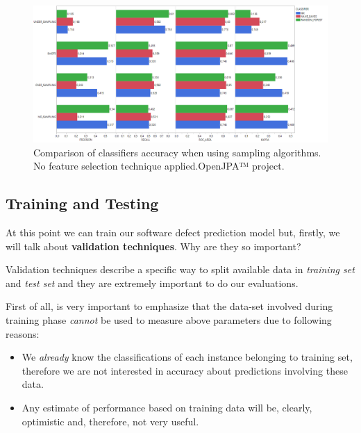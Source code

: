 \documentclass[sigconf]{acmart}
\begin{document}
\begin{figure}[h!]
  \centering
  \includegraphics[width=\textwidth]{./OPENJPA/Sampling.png}
  \caption{Comparison of classifiers accuracy when using sampling algorithms. No feature selection technique applied.\newline OpenJPA™ project. \newline\newline\newline\newline\newline}
  \label{OPENJPA-Sampling}
\end{figure}

\FloatBarrier

\subsection{Training and Testing}

At this point we can train our software defect prediction model but, firstly, we will talk about \textbf{validation techniques}. Why are they so important?

Validation techniques describe a specific way to split available data in \textit{training set} and \textit{test set} and they are extremely important to do our evaluations. 

First of all, is very important to emphasize that the data-set involved during training phase \textit{cannot} be used to measure above parameters due to following reasons:
\begin{itemize}

\item We \textit{already} know the classifications of each instance belonging to training set, therefore we are not interested in accuracy about predictions involving these data.

\item Any estimate of performance based on training data will be, clearly, optimistic and, therefore, not very useful.
\end{itemize}
\end{document}
